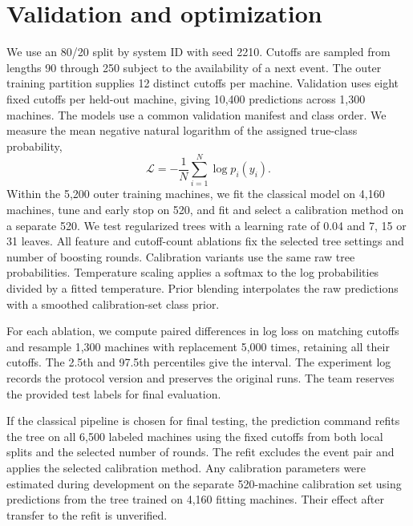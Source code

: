 \section{Validation and optimization}
We use an 80/20 split by system ID with seed 2210. Cutoffs are sampled from lengths 90 through 250 subject to the availability of a next event. The outer training partition supplies 12 distinct cutoffs per machine. Validation uses eight fixed cutoffs per held-out machine, giving 10,400 predictions across 1,300 machines. The models use a common validation manifest and class order. We measure the mean negative natural logarithm of the assigned true-class probability,
\[
  \mathcal{L}=-\frac{1}{N}\sum_{i=1}^{N}\log p_i(y_i).
\]
Within the 5,200 outer training machines, we fit the classical model on 4,160 machines, tune and early stop on 520, and fit and select a calibration method on a separate 520. We test regularized trees with a learning rate of 0.04 and 7, 15 or 31 leaves. All feature and cutoff-count ablations fix the selected tree settings and number of boosting rounds. Calibration variants use the same raw tree probabilities. Temperature scaling applies a softmax to the log probabilities divided by a fitted temperature. Prior blending interpolates the raw predictions with a smoothed calibration-set class prior.

For each ablation, we compute paired differences in log loss on matching cutoffs and resample 1,300 machines with replacement 5,000 times, retaining all their cutoffs. The 2.5th and 97.5th percentiles give the interval. The experiment log records the protocol version and preserves the original runs. The team reserves the provided test labels for final evaluation.

If the classical pipeline is chosen for final testing, the prediction command refits the tree on all 6,500 labeled machines using the fixed cutoffs from both local splits and the selected number of rounds. The refit excludes the event pair and applies the selected calibration method. Any calibration parameters were estimated during development on the separate 520-machine calibration set using predictions from the tree trained on 4,160 fitting machines. Their effect after transfer to the refit is unverified.

